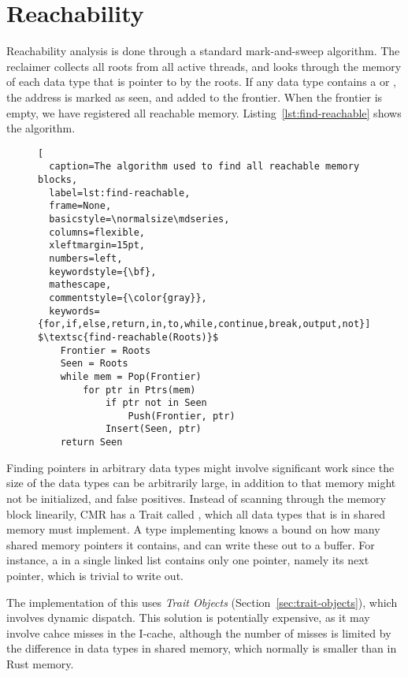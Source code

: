 \section{Reachability\label{sec:reachability}}

Reachability analysis is done through a standard mark-and-sweep algorithm. The reclaimer collects
all roots from all active threads, and looks through the memory of each data type that is pointer
to by the roots. If any data type contains a  or , the address is marked as seen,
and added to the frontier. When the frontier is empty, we have registered all reachable memory.
Listing~\ref{lst:find-reachable} shows the algorithm.

\begin{figure}[ht]
\begin{lstlisting}[
  caption=The algorithm used to find all reachable memory blocks,
  label=lst:find-reachable,
  frame=None,
  basicstyle=\normalsize\mdseries,
  columns=flexible,
  xleftmargin=15pt,
  numbers=left,
  keywordstyle={\bf},
  mathescape,
  commentstyle={\color{gray}},
  keywords={for,if,else,return,in,to,while,continue,break,output,not}]
$\textsc{find-reachable(Roots)}$
    Frontier = Roots
    Seen = Roots
    while mem = Pop(Frontier)
        for ptr in Ptrs(mem)
            if ptr not in Seen
                Push(Frontier, ptr)
            Insert(Seen, ptr)
    return Seen
\end{lstlisting}
\end{figure}

Finding pointers in arbitrary data types might involve significant work since the size of the data
types can be arbitrarily large, in addition to that memory might not be initialized, and false
positives. Instead of scanning through the memory block linearily,  CMR has a Trait called , which all
data types that is in shared memory must implement.  A type implementing  knows a bound
on how many shared memory pointers it contains, and can write these out to a buffer. For instance,
a  in a single linked list contains only one pointer, namely its next pointer, which is
trivial to write out.

The implementation of this uses \emph{Trait Objects} (Section~\ref{sec:trait-objects}), which involves
dynamic dispatch. This solution is potentially expensive, as it may involve cahce misses in the
I-cache, although the number of misses is limited by the difference in data types in shared memory,
which normally is smaller than in Rust memory.

